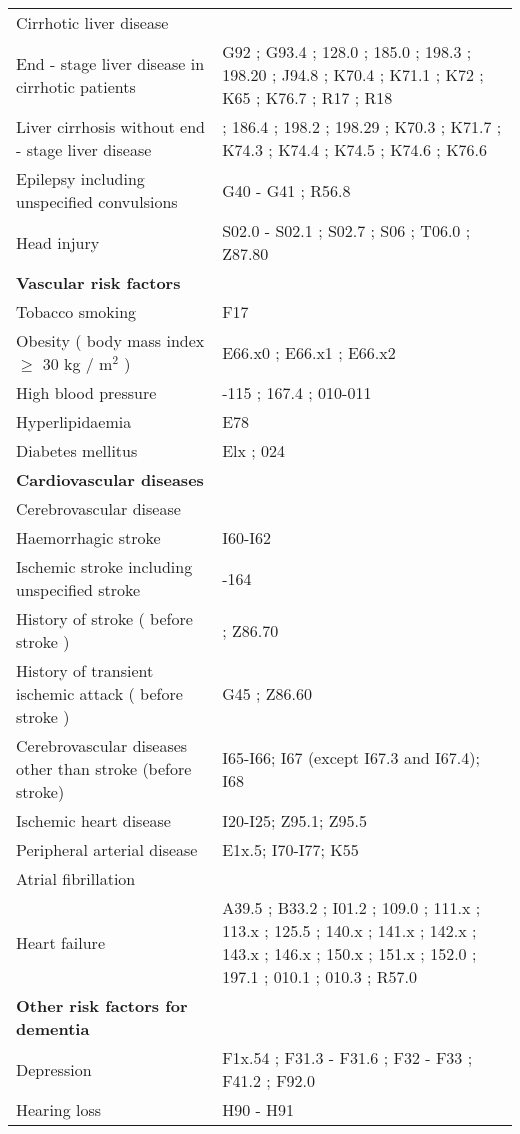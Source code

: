 \begin{longtable}[t]{>{\raggedright\arraybackslash}p{17em}>{\raggedright\arraybackslash}p{17em}}
Cirrhotic liver disease & \\
End - stage liver disease in cirrhotic patients & G92 ; G93.4 ; 128.0 ; 185.0 ; 198.3 ; 198.20 ; J94.8 ; K70.4 ; K71.1 ; K72 ; K65 ; K76.7 ; R17 ; R18\\
\addlinespace
Liver cirrhosis without end - stage liver disease & 185.9 ; 186.4 ; 198.2 ; 198.29 ; K70.3 ; K71.7 ; K74.3 ; K74.4 ; K74.5 ; K74.6 ; K76.6\\
Epilepsy including unspecified convulsions & G40 - G41 ; R56.8\\
Head injury & S02.0 - S02.1 ; S02.7 ; S06 ; T06.0 ; Z87.80\\
\textbf{Vascular risk factors} & \textbf{}\\
Tobacco smoking & F17\\
\addlinespace
Obesity ( body mass index $\geq$ 30 kg / m${}^2$ ) & E66.x0 ; E66.x1 ; E66.x2\\
High blood pressure & 110-115 ; 167.4 ; 010-011\\
Hyperlipidaemia & E78\\
Diabetes mellitus & Elx ; 024\\
\textbf{Cardiovascular diseases} & \textbf{}\\
\addlinespace
Cerebrovascular disease & \\
Haemorrhagic stroke & I60-I62\\
Ischemic stroke including unspecified stroke & 163-164\\
History of stroke ( before stroke ) & 169 ; Z86.70\\
History of transient ischemic attack ( before stroke ) & G45 ; Z86.60\\
\addlinespace
Cerebrovascular diseases other than stroke (before stroke) & I65-I66; I67 (except I67.3 and I67.4); I68\\
Ischemic heart disease & I20-I25; Z95.1; Z95.5\\
Peripheral arterial disease & E1x.5; I70-I77; K55\\
Atrial fibrillation & 148\\
Heart failure & A39.5 ; B33.2 ; I01.2 ; 109.0 ; 111.x ; 113.x ; 125.5 ; 140.x ; 141.x ; 142.x ; 143.x ; 146.x ; 150.x ; 151.x ; 152.0 ; 197.1 ; 010.1 ; 010.3 ; R57.0\\
\addlinespace
\textbf{Other risk factors for dementia} & \textbf{}\\
Depression & F1x.54 ; F31.3 - F31.6 ; F32 - F33 ; F41.2 ; F92.0\\
Hearing loss & H90 - H91\\

\end{longtable}
